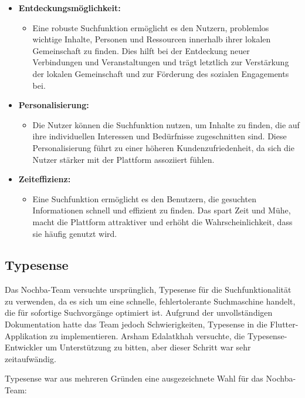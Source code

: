 \begin{itemize}
  \item \textbf{Entdeckungsmöglichkeit:}
        \begin{itemize}
          \item {Eine robuste Suchfunktion ermöglicht es den Nutzern, problemlos wichtige Inhalte, Personen und Ressourcen innerhalb ihrer lokalen Gemeinschaft zu finden. Dies hilft bei der Entdeckung neuer Verbindungen und Veranstaltungen und trägt letztlich zur Verstärkung der lokalen Gemeinschaft und zur Förderung des sozialen Engagements bei.}
        \end{itemize}
  \item \textbf{Personalisierung:}
        \begin{itemize}
          \item {Die Nutzer können die Suchfunktion nutzen, um Inhalte zu finden, die auf ihre individuellen Interessen und Bedürfnisse zugeschnitten sind. Diese Personalisierung führt zu einer höheren Kundenzufriedenheit, da sich die Nutzer stärker mit der Plattform assoziiert fühlen.}
        \end{itemize}
  \item \textbf{Zeiteffizienz:}
        \begin{itemize}
          \item {Eine Suchfunktion ermöglicht es den Benutzern, die gesuchten Informationen schnell und effizient zu finden. Das spart Zeit und Mühe, macht die Plattform attraktiver und erhöht die Wahrscheinlichkeit, dass sie häufig genutzt wird.}
        \end{itemize}
\end{itemize}

\subsection{Typesense}
Das Nochba-Team versuchte ursprünglich, Typesense für die Suchfunktionalität zu verwenden, da es sich um eine schnelle, fehlertolerante Suchmaschine handelt, die für sofortige Suchvorgänge optimiert ist. Aufgrund der unvollständigen Dokumentation hatte das Team jedoch Schwierigkeiten, Typesense in die Flutter-Applikation zu implementieren. Arsham Edalatkhah versuchte, die Typesense-Entwickler um Unterstützung zu bitten, aber dieser Schritt war sehr zeitaufwändig.

Typesense war aus mehreren Gründen eine ausgezeichnete Wahl für das Nochba-Team:

